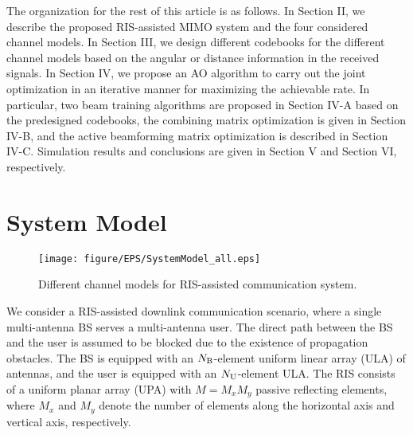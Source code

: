 \documentclass[lettersize, journal]{IEEEtran}
\begin{document}
The organization for the rest of this article is as follows.
In Section II, we describe the proposed RIS-assisted MIMO system and the four considered channel models.
In Section III, we design different codebooks for the different channel models based on the angular or distance information in the received signals.
In Section IV, we propose an AO algorithm to carry out the joint optimization in an iterative manner for maximizing the achievable rate. 
In particular, two beam training algorithms are proposed in Section IV-A based on the predesigned codebooks, the combining matrix optimization is given in Section IV-B, and the active beamforming matrix optimization is described in Section IV-C. 
Simulation results and conclusions are given in Section V and Section VI, respectively.


\section{System Model}


\begin{figure*}[t]
\begin{center}
\texttt{[image: figure/EPS/SystemModel\_all.eps]}
\caption{Different channel models for RIS-assisted communication system.} 
\label{SystemModel_all}
\end{center}
\end{figure*}

We consider a RIS-assisted downlink communication scenario, where a single multi-antenna BS serves a multi-antenna user.
The direct path between the BS and the user is assumed to be blocked due to the existence of propagation obstacles.
The BS is equipped with an $N_{\rm{B}}$-element uniform linear array (ULA) of antennas, and the user is equipped with an $N_{\rm{U}}$-element ULA.
The RIS consists of a uniform planar array (UPA) with $M={M_x}{M_y}$ passive reflecting elements, where ${M_x}$ and ${M_y}$ denote the number of elements along the horizontal axis and vertical axis, respectively.
\end{document}
